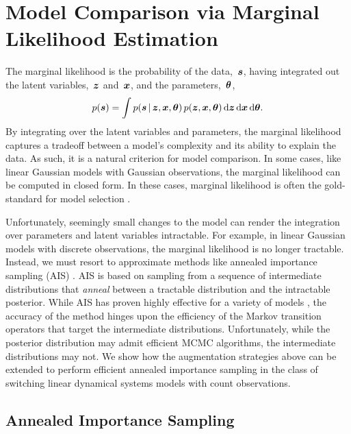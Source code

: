 \section{Model Comparison via Marginal Likelihood Estimation}
The marginal likelihood is the probability of the
data,~$\boldsymbol{s}$, having integrated out the latent
variables,~$\boldsymbol{z}$ and~$\boldsymbol{x}$, and the parameters,~$\boldsymbol{\theta}$,
\begin{align*}
  p(\boldsymbol{s}) = \int p(\boldsymbol{s} \,|\, \boldsymbol{z}, \boldsymbol{x}, \boldsymbol{\theta}) \, 
  p(\boldsymbol{z}, \boldsymbol{x}, \boldsymbol{\theta}) \, \mathrm{d} \boldsymbol{z} \, \mathrm{d}\boldsymbol{x} \, \mathrm{d}\boldsymbol{\theta}.
\end{align*}
By integrating over the latent variables and parameters, the marginal
likelihood captures a tradeoff between a model's complexity and its
ability to explain the data.  As such, it is a natural criterion for
model comparison. In some cases, like linear Gaussian models with Gaussian observations,
 the marginal likelihood can be computed in closed form. 
In these cases, marginal likelihood is often the gold-standard 
for model selection \citep{kass1995bayes, grosse2015sandwiching}.

Unfortunately, seemingly small changes to the model can render the
integration over parameters and latent variables intractable.  For
example, in linear Gaussian models with discrete observations, the
marginal likelihood is no longer tractable.  Instead, we must resort
to approximate methods like annealed importance sampling (AIS)
\citep{neal2001annealed}.  AIS is based on sampling from a sequence of
intermediate distributions that \emph{anneal} between a tractable
distribution and the intractable posterior. While AIS has proven
highly effective for a variety of models
\citep{grosse2015sandwiching}, the accuracy of the method hinges upon
the efficiency of the Markov transition operators that target the
intermediate distributions.  Unfortunately, while the posterior 
distribution may admit efficient MCMC algorithms, the intermediate 
distributions may not. We show how the \polyagamma
augmentation strategies above can be extended to perform efficient
annealed importance sampling in the class of switching linear
dynamical systems models with count observations.

\subsection{Annealed Importance Sampling}

